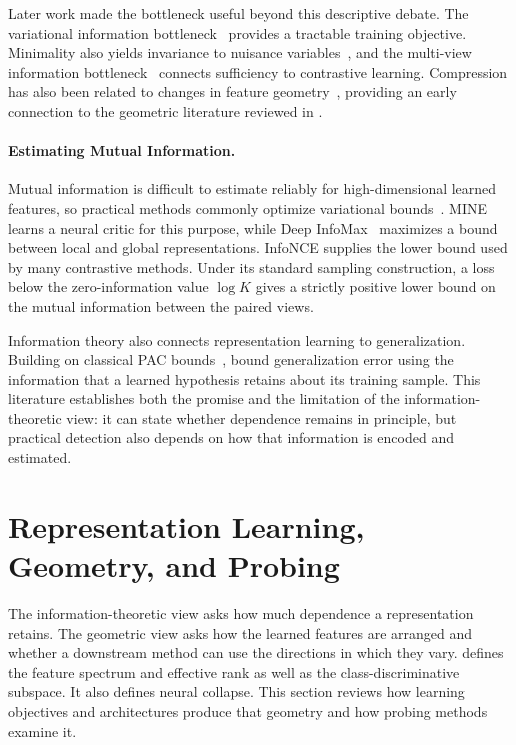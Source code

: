Later work made the bottleneck useful beyond this descriptive debate. The
variational information bottleneck~\citep{alemi2017deep} provides a tractable
training objective. Minimality also yields invariance to nuisance
variables~\citep{achille2018emergence}, and the multi-view information
bottleneck~\citep{federici2020learning} connects sufficiency to contrastive
learning. Compression has also been related to changes in feature
geometry~\citep{shwartz2023compress}, providing an early connection to the
geometric literature reviewed in .

\paragraph{Estimating Mutual Information.}
Mutual information is difficult to estimate reliably for high-dimensional learned
features, so practical methods commonly optimize variational
bounds~\citep{poole2019variational}. MINE~\citep{belghazi2018mutual} learns a neural
critic for this purpose, while Deep InfoMax~\citep{hjelm2019learning} maximizes a
bound between local and global representations. InfoNCE
\citep{oord2018representation} supplies the lower bound used by many contrastive
methods. Under its standard sampling construction, a loss below the
zero-information value $\log K$ gives a strictly positive lower bound on the mutual
information between the paired views.

Information theory also connects representation learning to generalization.
Building on classical PAC bounds~\citep{mcallester1999pac},
\citet{xu2017information} bound generalization error using the information that a
learned hypothesis retains about its training sample. This literature establishes
both the promise and the limitation of the information-theoretic view: it can
state whether dependence remains in principle, but practical detection also
depends on how that information is encoded and estimated.

\section{Representation Learning, Geometry, and Probing}
\label{sec:lit:representation}

The information-theoretic view asks how much dependence a representation retains.
The geometric view asks how the learned features are arranged and whether a
downstream method can use the directions in which they vary. 
defines the feature spectrum and effective rank as well as the class-discriminative
subspace. It also defines neural collapse. This section reviews how learning
objectives and architectures produce that geometry and how probing methods examine
it.


